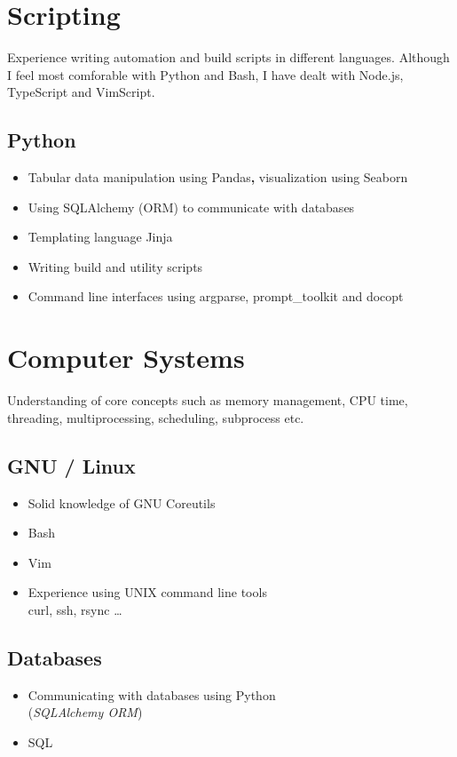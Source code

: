 \documentclass[a4paper, 13pt, draft]{article}
\newcommand{\proglang}[1]{\subsection*{#1}}
\begin{document}
\begin{multicols}{2}

    \section*{\color{col1}Scripting\color{default}}

    Experience writing automation and build scripts in different languages.
    Although I feel most comforable with Python and Bash, I have dealt with
    Node.js, TypeScript and VimScript.

    \proglang{Python}

    \begin{itemize}[leftmargin=*]
	\setlength\itemsep{12pt}
    \item
	Tabular data manipulation using Pandas\textbf{,} visualization using
	Seaborn
    \item
	Using SQLAlchemy (ORM) to communicate with databases
    \item
	Templating language Jinja
    \item
	Writing build and utility scripts
    \item
	Command line interfaces using argparse, prompt\_toolkit and docopt
\end{itemize}

\section*{\color{col1} Computer Systems \color{default}}

Understanding of core concepts such as memory management, CPU time,
threading, multiprocessing, scheduling, subprocess etc. \\

\subsection*{GNU / Linux}

\begin{itemize}[leftmargin=*]
    \setlength\itemsep{0em}
\item Solid knowledge of GNU Coreutils
\item Bash
\item Vim
\item Experience using UNIX command line tools \\
    curl, ssh, rsync \dots
\end{itemize}

\subsection*{Databases}

\begin{itemize}[leftmargin=*]
    \setlength\itemsep{0em}
\item Communicating with databases using Python \\ (\textit{SQLAlchemy ORM})
\item SQL \\ 
\end{itemize}
\end{multicols}
\end{document}
